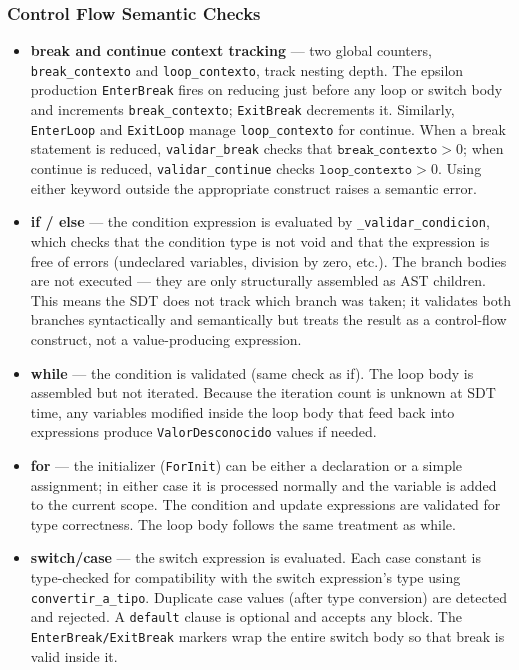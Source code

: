 \documentclass[letterpaper,12pt,oneside]{article}
\begin{document}
\subsubsection{Control Flow Semantic Checks}
\begin{itemize}
    \item \textbf{break and continue context tracking} --- two global counters, \texttt{break\_contexto} and \texttt{loop\_contexto}, track nesting depth. The epsilon production \texttt{EnterBreak} fires on reducing just before any loop or switch body and increments \texttt{break\_contexto}; \texttt{ExitBreak} decrements it. Similarly, \texttt{EnterLoop} and \texttt{ExitLoop} manage \texttt{loop\_contexto} for continue. When a break statement is reduced, \texttt{validar\_break} checks that $\texttt{break\_contexto} > 0$; when continue is reduced, \texttt{validar\_continue} checks $\texttt{loop\_contexto} > 0$. Using either keyword outside the appropriate construct raises a semantic error.
    \item \textbf{if / else} --- the condition expression is evaluated by \texttt{\_validar\_condicion}, which checks that the condition type is not void and that the expression is free of errors (undeclared variables, division by zero, etc.). The branch bodies are not executed --- they are only structurally assembled as AST children. This means the SDT does not track which branch was taken; it validates both branches syntactically and semantically but treats the result as a control-flow construct, not a value-producing expression.
    \item \textbf{while} --- the condition is validated (same check as if). The loop body is assembled but not iterated. Because the iteration count is unknown at SDT time, any variables modified inside the loop body that feed back into expressions produce \texttt{ValorDesconocido} values if needed.
    \item \textbf{for} --- the initializer (\texttt{ForInit}) can be either a declaration or a simple assignment; in either case it is processed normally and the variable is added to the current scope. The condition and update expressions are validated for type correctness. The loop body follows the same treatment as while.
    \item \textbf{switch/case} --- the switch expression is evaluated. Each case constant is type-checked for compatibility with the switch expression's type using \texttt{convertir\_a\_tipo}. Duplicate case values (after type conversion) are detected and rejected. A \texttt{default} clause is optional and accepts any block. The \texttt{EnterBreak/ExitBreak} markers wrap the entire switch body so that break is valid inside it.
\end{itemize}
\end{document}
